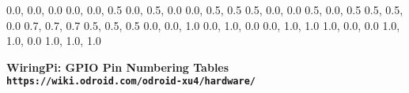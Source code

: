 \documentclass[11pt,a4paper]{article}
\begin{document}
\begin{sffamily}
\definecolor{rtb-black}{rgb}  {0.0, 0.0, 0.0}
\definecolor{rtb-navy}{rgb}   {0.0, 0.0, 0.5}
\definecolor{rtb-green}{rgb}  {0.0, 0.5, 0.0}
\definecolor{rtb-teal}{rgb}   {0.0, 0.5, 0.5}
\definecolor{rtb-maroon}{rgb} {0.5, 0.0, 0.0}
\definecolor{rtb-purple}{rgb} {0.5, 0.0, 0.5}
\definecolor{rtb-olive}{rgb}  {0.5, 0.5, 0.0}
\definecolor{rtb-silver}{rgb} {0.7, 0.7, 0.7}
\definecolor{rtb-grey}{rgb}   {0.5, 0.5, 0.5}
\definecolor{rtb-blue}{rgb}   {0.0, 0.0, 1.0}
\definecolor{rtb-lime}{rgb}   {0.0, 1.0, 0.0}
\definecolor{rtb-aqua}{rgb}   {0.0, 1.0, 1.0}
\definecolor{rtb-red}{rgb}    {1.0, 0.0, 0.0}
\definecolor{rtb-yellow}{rgb} {1.0, 1.0, 0.0}
\definecolor{rtb-white}{rgb}  {1.0, 1.0, 1.0}

\begin{center}
\bfseries{WiringPi: GPIO Pin Numbering Tables}\\
\tt{https://wiki.odroid.com/odroid-xu4/hardware/}
\end{center}


\end{sffamily}
\end{document}
